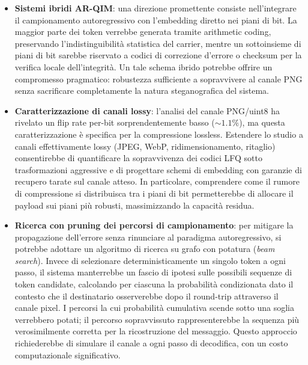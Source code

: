 \begin{itemize}
	\item \textbf{Sistemi ibridi AR-QIM}: una direzione promettente consiste nell'integrare il campionamento autoregressivo con l'embedding diretto nei piani di bit. La maggior parte dei token verrebbe generata tramite arithmetic coding, preservando l'indistinguibilità statistica del carrier, mentre un sottoinsieme di piani di bit sarebbe riservato a codici di correzione d'errore o checksum per la verifica locale dell'integrità. Un tale schema ibrido potrebbe offrire un compromesso pragmatico: robustezza sufficiente a sopravvivere al canale PNG senza sacrificare completamente la natura steganografica del sistema.
	
	\item \textbf{Caratterizzazione di canali lossy}: l'analisi del canale PNG/uint8 ha rivelato un flip rate per-bit sorprendentemente basso ($\sim 1.1\%$), ma questa caratterizzazione è specifica per la compressione lossless. Estendere lo studio a canali effettivamente lossy (JPEG, WebP, ridimensionamento, ritaglio) consentirebbe di quantificare la sopravvivenza dei codici LFQ sotto trasformazioni aggressive e di progettare schemi di embedding con garanzie di recupero tarate sul canale atteso. In particolare, comprendere come il rumore di compressione si distribuisca tra i piani di bit permetterebbe di allocare il payload sui piani più robusti, massimizzando la capacità residua.
	
	\item \textbf{Ricerca con pruning dei percorsi di campionamento}: per mitigare la propagazione dell'errore senza rinunciare al paradigma autoregressivo, si potrebbe adottare un algoritmo di ricerca su grafo con potatura (\emph{beam search}). Invece di selezionare deterministicamente un singolo token a ogni passo, il sistema manterrebbe un fascio di ipotesi sulle possibili sequenze di token candidate, calcolando per ciascuna la probabilità condizionata dato il contesto che il destinatario osserverebbe dopo il round-trip attraverso il canale pixel. I percorsi la cui probabilità cumulativa scende sotto una soglia verrebbero potati; il percorso sopravvissuto rappresenterebbe la sequenza più verosimilmente corretta per la ricostruzione del messaggio. Questo approccio richiederebbe di simulare il canale a ogni passo di decodifica, con un costo computazionale significativo.
	

\end{itemize}
